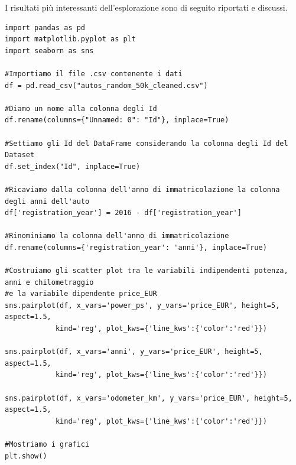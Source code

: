I risultati più interessanti dell'esplorazione sono di seguito riportati e discussi.
\bigskip

\lstset{language=Python}
\lstset{frame=lines}
\lstset{basicstyle=\footnotesize}
\lstset{columns=fullflexible}
\begin{lstlisting}
import pandas as pd
import matplotlib.pyplot as plt
import seaborn as sns

#Importiamo il file .csv contenente i dati
df = pd.read_csv("autos_random_50k_cleaned.csv")

#Diamo un nome alla colonna degli Id
df.rename(columns={"Unnamed: 0": "Id"}, inplace=True)

#Settiamo gli Id del DataFrame considerando la colonna degli Id del Dataset
df.set_index("Id", inplace=True)

#Ricaviamo dalla colonna dell'anno di immatricolazione la colonna degli anni dell'auto
df['registration_year'] = 2016 - df['registration_year']

#Rinominiamo la colonna dell'anno di immatricolazione
df.rename(columns={'registration_year': 'anni'}, inplace=True)

#Costruiamo gli scatter plot tra le variabili indipendenti potenza, anni e chilometraggio
#e la variabile dipendente price_EUR
sns.pairplot(df, x_vars='power_ps', y_vars='price_EUR', height=5, aspect=1.5, 
            kind='reg', plot_kws={'line_kws':{'color':'red'}})

sns.pairplot(df, x_vars='anni', y_vars='price_EUR', height=5, aspect=1.5, 
            kind='reg', plot_kws={'line_kws':{'color':'red'}})

sns.pairplot(df, x_vars='odometer_km', y_vars='price_EUR', height=5, aspect=1.5, 
            kind='reg', plot_kws={'line_kws':{'color':'red'}})

#Mostriamo i grafici
plt.show()
\end{lstlisting}


